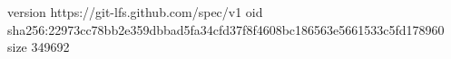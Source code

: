version https://git-lfs.github.com/spec/v1
oid sha256:22973cc78bb2e359dbbad5fa34cfd37f8f4608bc186563e5661533c5fd178960
size 349692

